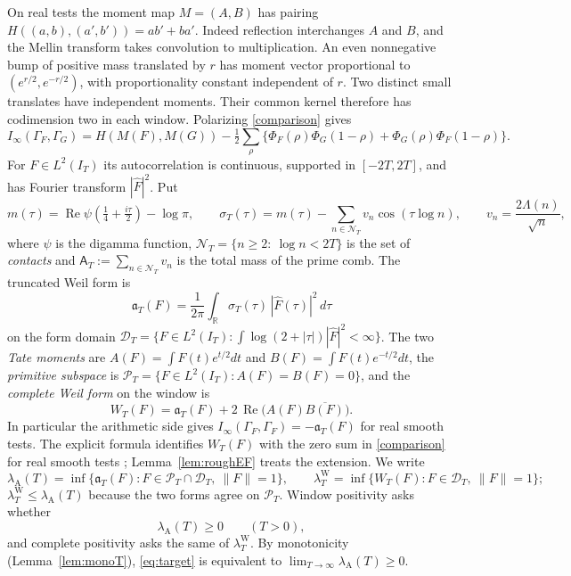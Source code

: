 \documentclass[10pt]{amsart}
\theoremstyle{definition}
\theoremstyle{remark}
\newcommand{\R}{\mathbb R}
\newcommand{\Rel}{\operatorname{Re}}
\newcommand{\PT}{\mathcal P_T}
\newcommand{\IT}{I_T}
\newcommand{\lamW}{\lambda^{\mathrm W}_T}
\newcommand{\lamA}{\lambda_{\mathrm A}(T)}
\newcommand{\sT}{\sigma_T}
\newcommand{\Fh}{\widehat F}
\newcommand{\NT}{\mathcal N_T}
\newcommand{\Aconst}{\mathsf A_T}
\begin{document}
On real tests the moment map $M=(A,B)$ has pairing
$H((a,b),(a',b'))=ab'+ba'$. Indeed reflection interchanges $A$
and $B$, and the Mellin transform takes convolution to multiplication.
An even nonnegative bump of positive mass translated by $r$ has moment
vector proportional to $(e^{r/2},e^{-r/2})$, with proportionality
constant independent of $r$. Two distinct small translates have
independent moments. Their common kernel therefore has codimension
two in each window. Polarizing \eqref{comparison} gives
\[
 I_\infty(\Gamma_F,\Gamma_G)=H(M(F),M(G))-
 \tfrac12\sum_\rho\{\Phi_F(\rho)\Phi_G(1-\rho)+\Phi_G(\rho)\Phi_F(1-\rho)\}.
\]
For $F\in L^2(\IT)$ its autocorrelation is continuous, supported
in $[-2T,2T]$, and has Fourier transform $|\Fh|^2$. Put
\begin{equation}\label{eq:symbol}
m(\tau)=\Rel\psi\!\left(\tfrac14+\tfrac{i\tau}{2}\right)-\log\pi,\qquad
\sT(\tau)=m(\tau)-\sum_{n\in\NT}v_n\cos(\tau\log n),\qquad v_n=\frac{2\Lambda(n)}{\sqrt n},
\end{equation}
where $\psi$ is the digamma function, $\NT=\{n\ge2:\ \log n<2T\}$ is the set of \emph{contacts} and
$\Aconst:=\sum_{n\in\NT}v_n$ is the total mass of the prime comb. The truncated Weil form is
\begin{equation}\label{eq:form}
\mathfrak a_T(F)=\frac1{2\pi}\int_\R\sT(\tau)\,|\Fh(\tau)|^2\,d\tau
\end{equation}
on the form domain $\mathcal D_T=\{F\in L^2(\IT):\int\log(2+|\tau|)|\Fh|^2<\infty\}$. The two \emph{Tate
moments} are $A(F)=\int F(t)e^{t/2}dt$ and $B(F)=\int F(t)e^{-t/2}dt$, the \emph{primitive subspace} is
$\PT=\{F\in L^2(\IT):A(F)=B(F)=0\}$, and the \emph{complete Weil form} on the window is
\begin{equation}\label{eq:W}
W_T(F)=\mathfrak a_T(F)+2\,\Rel\big(A(F)\overline{B(F)}\big).
\end{equation}
In particular the arithmetic side gives $I_\infty(\Gamma_F,\Gamma_F)=-\mathfrak a_T(F)$ for real smooth tests. The explicit formula identifies $W_T(F)$ with the zero sum in
\eqref{comparison} for real smooth tests \cite{Weil52,Paper45};
Lemma~\ref{lem:roughEF} treats the extension. We write
\[
\lamA=\inf\{\mathfrak a_T(F):F\in\PT\cap\mathcal D_T,\ \|F\|=1\},\qquad
\lamW=\inf\{W_T(F):F\in\mathcal D_T,\ \|F\|=1\};
\]
$\lamW\le\lamA$ because the two forms agree on $\PT$. Window positivity asks whether
\begin{equation}\label{eq:target}
\lamA\ge0\qquad(T>0),
\end{equation}
and complete positivity asks the same of $\lamW$. By monotonicity
(Lemma~\ref{lem:monoT}), \eqref{eq:target} is equivalent to
$\lim_{T\to\infty}\lamA\ge0$.
\end{document}

